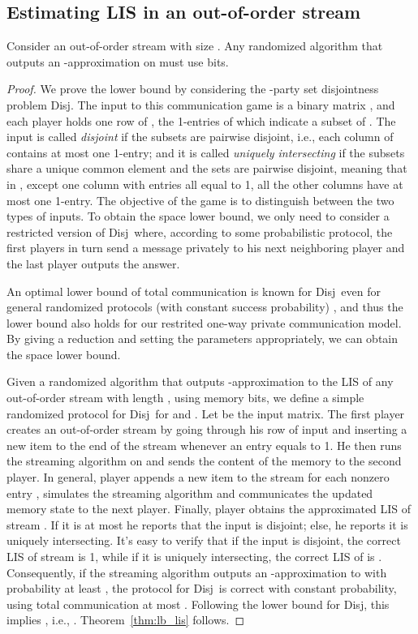\documentclass{llncs}
\newcommand{\disj}{{\sc Disj}}
\begin{document}
\subsection{Estimating LIS in an out-of-order stream}

\begin{theorem}\label{thm:lb_lis}
  Consider an out-of-order stream  with size .  Any randomized
  algorithm that outputs an -approximation on  must use
   bits.
\end{theorem}

\begin{proof}
We prove the lower bound by considering the -party set disjointness
problem \disj.  The input to this communication game is a binary 
matrix , and each player  holds one row of
, the 1-entries of which indicate a subset  of .  The input
 is called \emph{disjoint} if the  subsets are pairwise
disjoint, i.e., each column of  contains at most one 1-entry; and it is
called \emph{uniquely intersecting} if the subsets  share a unique common
element  and the sets  are pairwise disjoint, meaning that in
, except one column with entries all equal to 1, all the other columns have at most one
1-entry.  The objective of the game is to distinguish between the two types of
inputs.  To obtain the space lower bound, we only need to consider a restricted 
version of \disj~where, according to some probabilistic protocol, the first
 players in turn send a message privately to his next neighboring player and the last
player  outputs the answer.

An optimal lower bound of  total communication is known for
\disj~even for general randomized protocols (with constant success probability) 
\cite{Jay09}, and thus the lower
bound also holds for our restrited one-way private communication model.  By
giving a reduction and setting the parameters appropriately, we can obtain the
space lower bound.

Given a randomized algorithm that outputs -approximation to the LIS of any out-of-order stream
with length , using  memory bits, we
define a simple randomized protocol for \disj~for  and .  Let  be the input  matrix.  The first player
 creates an out-of-order stream  by going through his row of input
 and inserting a new item  to
the end of the stream
whenever an entry  equals to 1.  He then runs the streaming algorithm on
 and sends the content of the memory to the second player.  In general,
player  appends a new item  to the
stream for each nonzero entry , simulates the streaming algorithm and
communicates the updated memory state to the next player.  Finally, player  obtains
the approximated LIS of stream .  If it is at most  he reports
that the input  is disjoint; else, he reports it is uniquely intersecting.
It's easy to verify that if the input  is disjoint, the correct LIS of stream  is 1,
while if it is uniquely intersecting, the correct LIS of  is .
Consequently, if the streaming algorithm outputs an -approximation to
 with probability at least , the protocol for \disj~is
correct with constant probability, using total communication at most .
Following the lower bound for \disj, this implies ,
i.e., .  Theorem~\ref{thm:lb_lis} follows.
\end{proof}
\end{document}

